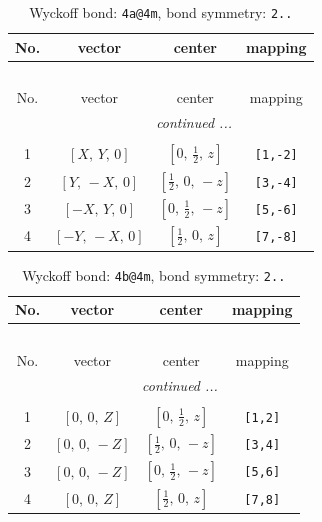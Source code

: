 \documentclass[fleqn,8pt]{jsarticle}
\begin{document}
\begin{longtable}{cccc}
\caption{Wyckoff bond: {\tt 4a@4m}, bond symmetry: {\tt 2..}}
 \\
 \hline \hline
No. & vector & center & mapping \\ \hline \endfirsthead

\multicolumn{3}{l}{\tablename\ \thetable{}} \\
 \hline \hline
No. & vector & center & mapping \\ \hline \endhead

 \hline \hline
\multicolumn{3}{r}{\footnotesize\it continued ...} \\ \endfoot

 \hline \hline
\multicolumn{3}{r}{} \\ \endlastfoot

1 & $\left[ X,\, Y,\, 0 \right]$ & $\left[ 0,\, \frac{1}{2},\, z \right]$ & {\tt [1,-2]} \\ \hline
2 & $\left[ Y,\, - X,\, 0 \right]$ & $\left[ \frac{1}{2},\, 0,\, - z \right]$ & {\tt [3,-4]} \\ \hline
3 & $\left[ - X,\, Y,\, 0 \right]$ & $\left[ 0,\, \frac{1}{2},\, - z \right]$ & {\tt [5,-6]} \\ \hline
4 & $\left[ - Y,\, - X,\, 0 \right]$ & $\left[ \frac{1}{2},\, 0,\, z \right]$ & {\tt [7,-8]} \\
\end{longtable}
\renewcommand{\arraystretch}{1.2}
\begin{longtable}{cccc}
\caption{Wyckoff bond: {\tt 4b@4m}, bond symmetry: {\tt 2..}}
 \\
 \hline \hline
No. & vector & center & mapping \\ \hline \endfirsthead

\multicolumn{3}{l}{\tablename\ \thetable{}} \\
 \hline \hline
No. & vector & center & mapping \\ \hline \endhead

 \hline \hline
\multicolumn{3}{r}{\footnotesize\it continued ...} \\ \endfoot

 \hline \hline
\multicolumn{3}{r}{} \\ \endlastfoot

1 & $\left[ 0,\, 0,\, Z \right]$ & $\left[ 0,\, \frac{1}{2},\, z \right]$ & {\tt [1,2]} \\ \hline
2 & $\left[ 0,\, 0,\, - Z \right]$ & $\left[ \frac{1}{2},\, 0,\, - z \right]$ & {\tt [3,4]} \\ \hline
3 & $\left[ 0,\, 0,\, - Z \right]$ & $\left[ 0,\, \frac{1}{2},\, - z \right]$ & {\tt [5,6]} \\ \hline
4 & $\left[ 0,\, 0,\, Z \right]$ & $\left[ \frac{1}{2},\, 0,\, z \right]$ & {\tt [7,8]} \\
\end{longtable}
\end{document}
